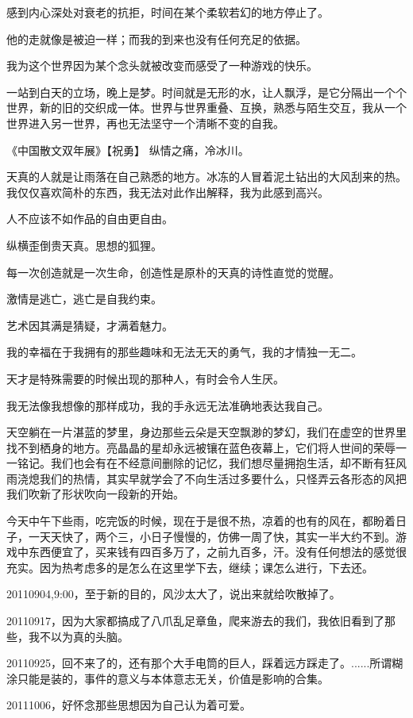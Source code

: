 \documentclass[UTF8]{Diaries}
\begin{document}
感到内心深处对衰老的抗拒，时间在某个柔软若幻的地方停止了。

他的走就像是被迫一样；而我的到来也没有任何充足的依据。

我为这个世界因为某个念头就被改变而感受了一种游戏的快乐。

一站到白天的立场，晚上是梦。时间就是无形的水，让人飘浮，是它分隔出一个个世界，新的旧的交织成一体。世界与世界重叠、互换，熟悉与陌生交互，我从一个世界进入另一世界，再也无法坚守一个清晰不变的自我。

《中国散文双年展》【祝勇】
纵情之痛，冷冰川。

天真的人就是让雨落在自己熟悉的地方。冰冻的人冒着泥土钻出的大风刮来的热。我仅仅喜欢简朴的东西，我无法对此作出解释，我为此感到高兴。

人不应该不如作品的自由更自由。

纵横歪倒贵天真。思想的狐狸。

每一次创造就是一次生命，创造性是原朴的天真的诗性直觉的觉醒。

激情是逃亡，逃亡是自我约束。

艺术因其满是猜疑，才满着魅力。

我的幸福在于我拥有的那些趣味和无法无天的勇气，我的才情独一无二。

天才是特殊需要的时候出现的那种人，有时会令人生厌。

我无法像我想像的那样成功，我的手永远无法准确地表达我自己。

天空躺在一片湛蓝的梦里，身边那些云朵是天空飘渺的梦幻，我们在虚空的世界里找不到栖身的地方。亮晶晶的星却永远被镶在蓝色夜幕上，它们将人世间的荣辱一一铭记。我们也会有在不经意间删除的记忆，我们想尽量拥抱生活，却不断有狂风雨浇熄我们的热情，其实早就学会了不向生活过多要什么，只怪弄云各形态的风把我们吹新了形状吹向一段新的开始。

今天中午下些雨，吃完饭的时候，现在于是很不热，凉着的也有的风在，都盼着日子，一天天快了，两个三，小日子慢慢的，仿佛一周了快，其实一半大约不到。游戏中东西便宜了，买来钱有四百多万了，之前九百多，汗。没有任何想法的感觉很充实。因为热考虑多的是怎么在这里学下去，继续；课怎么进行，下去还。

20110904,9:00，至于新的目的，风沙太大了，说出来就给吹散掉了。

20110917，因为大家都搞成了八爪乱足章鱼，爬来游去的我们，我依旧看到了那些，我不以为真的头脑。

20110925，回不来了的，还有那个大手电筒的巨人，踩着远方踩走了。......所谓糊涂只能是装的，事件的意义与本体意志无关，价值是影响的合集。

20111006，好怀念那些思想因为自己认为着可爱。
\end{document}
